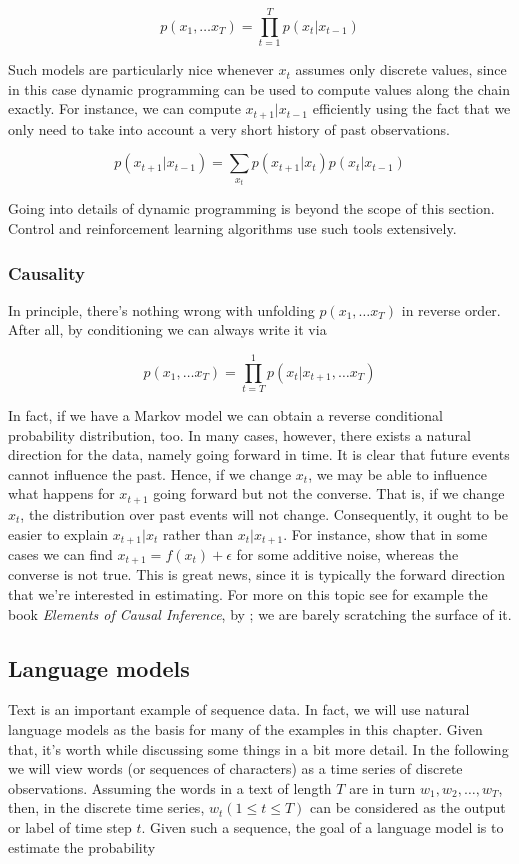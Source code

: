 $$p(x_1, \ldots x_T) = \prod_{t=1}^T p(x_t|x_{t-1})$$

Such models are particularly nice whenever $x_t$ assumes only discrete values, since in this case dynamic programming can be used to compute values along the chain exactly. For instance, we can compute $x_{t+1}|x_{t-1}$ efficiently using the fact that we only need to take into account a very short history of past observations.

$$p(x_{t+1}|x_{t-1}) = \sum_{x_t} p(x_{t+1}|x_t) p(x_t|x_{t-1})$$

Going into details of dynamic programming is beyond the scope of this section. Control and reinforcement learning algorithms use such tools extensively.

\subsubsection{Causality}

In principle, there’s nothing wrong with unfolding $p(x_1, \ldots x_T)$ in reverse order. After all, by conditioning we can always write it via

$$p(x_1, \ldots x_T) = \prod_{t=T}^1 p(x_t|x_{t+1}, \ldots x_T)$$

In fact, if we have a Markov model we can obtain a reverse conditional probability distribution, too. In many cases, however, there exists a natural direction for the data, namely going forward in time. It is clear that future events cannot influence the past. Hence, if we change $x_t$, we may be able to influence what happens for $x_{t+1}$ going forward but not the converse. That is, if we change $x_t$, the distribution over past events will not change. Consequently, it ought to be easier to explain $x_{t+1}|x_t$ rather than $x_t|x_{t+1}$. For instance, \citet{Hoyer2008} show that in some cases we can find $x_{t+1} = f(x_t) + \epsilon$ for some additive noise, whereas the converse is not true. This is great news, since it is typically the forward direction that we’re interested in estimating. For more on this topic see for example the book \textit{Elements of Causal Inference}, by \citet{Peters2015}; we are barely scratching the surface of it.

\subsection{Language models}

Text is an important example of sequence data. In fact, we will use natural language models as the basis for many of the examples in this chapter. Given that, it’s worth while discussing some things in a bit more detail. In the following we will view words (or sequences of characters) as a time series of discrete observations. Assuming the words in a text of length $T$ are in turn $w_1, w_2, \ldots, w_T$, then, in the discrete time series, $w_t(1 \leq t \leq T)$ can be considered as the output or label of time step $t$. Given such a sequence, the goal of a language model is to estimate the probability

